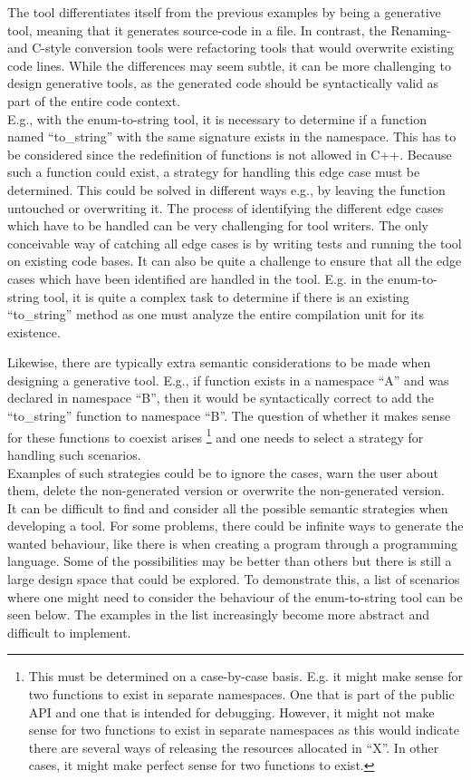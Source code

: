 The tool differentiates itself from the previous examples by being a generative tool, meaning that it generates source-code in a file.
In contrast, the Renaming- and C-style conversion tools were refactoring tools that would overwrite existing code lines.
While the differences may seem subtle, it can be more challenging to design generative tools, as the generated code should be syntactically valid as part of the entire code context.\\
E.g., with the enum-to-string tool, it is necessary to determine if a function named ``to\_string'' with the same signature exists in the namespace. This has to be considered since the redefinition of functions is not allowed in C++.
Because such a function could exist, a strategy for handling this edge case must be determined. 
This could be solved in different ways e.g., by leaving the function untouched or overwriting it. 
The process of identifying the different edge cases which have to be handled can be very challenging for tool writers. 
The only conceivable way of catching all edge cases is by writing tests and running the tool on existing code bases. 
It can also be quite a challenge to ensure that all the edge cases which have been identified are handled in the tool. 
E.g. in the enum-to-string tool, it is quite a complex task to determine if there is an existing ``to\_string'' method as one must analyze the entire compilation unit for its existence.

Likewise, there are typically extra semantic considerations to be made when designing a generative tool. E.g., if  function exists in a namespace ``A'' and  was declared in namespace ``B'', then it would be syntactically correct to add the ``to\_string'' function to namespace ``B''. The question of whether it makes sense for these functions to coexist arises \footnote{This must be determined on a case-by-case basis. E.g. it might make sense for two  functions to exist in separate namespaces. One that is part of the public API and one that is intended for debugging. However, it might not make sense for two  functions to exist in separate namespaces as this would indicate there are several ways of releasing the resources allocated in ``X''. In other cases, it might make perfect sense for two  functions to exist.}
and one needs to select a strategy for handling such scenarios.\\
Examples of such strategies could be to ignore the cases, warn the user about them, delete the non-generated version or overwrite the non-generated version.\\
It can be difficult to find and consider all the possible semantic strategies when developing a tool. For some problems, there could be infinite ways to generate the wanted behaviour, like there is when creating a program through a programming language. Some of the possibilities may be better than others but there is still a large design space that could be explored.
To demonstrate this, a list of scenarios where one might need to consider the behaviour of the enum-to-string tool can be seen below. The examples in the list increasingly become more abstract and difficult to implement.


